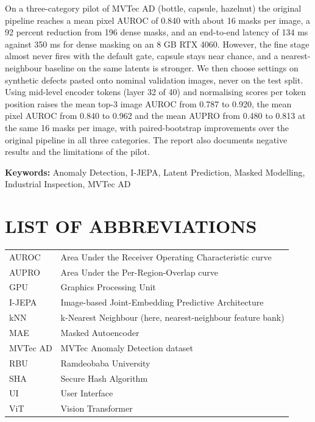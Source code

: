 \documentclass[12pt,a4paper,oneside]{report}
\begin{document}
On a three-category pilot of MVTec AD (bottle, capsule, hazelnut) the
original pipeline reaches a mean pixel AUROC of 0.840 with about 16 masks
per image, a 92 percent reduction from 196 dense masks, and an end-to-end
latency of 134 ms against 350 ms for dense masking on an 8 GB RTX 4060.
However, the fine stage almost never fires with the default gate, capsule
stays near chance, and a nearest-neighbour baseline on the same latents is
stronger. We then choose settings on synthetic defects pasted onto nominal
validation images, never on the test split. Using mid-level encoder tokens
(layer 32 of 40) and normalising scores per token position raises the mean
top-3 image AUROC from 0.787 to 0.920, the mean pixel AUROC from 0.840 to
0.962 and the mean AUPRO from 0.480 to 0.813 at the same 16 masks per
image, with paired-bootstrap improvements over the original pipeline in all
three categories. The report also documents negative results and the
limitations of the pilot.

\textbf{Keywords:} Anomaly Detection, I-JEPA, Latent Prediction, Masked
Modelling, Industrial Inspection, MVTec AD

\tableofcontents
\clearpage

\listoffigures
\clearpage

\listoftables
\clearpage

\chapter*{LIST OF ABBREVIATIONS}

\begin{tabular}{ll}
AUROC & Area Under the Receiver Operating Characteristic curve\\
AUPRO & Area Under the Per-Region-Overlap curve\\
GPU & Graphics Processing Unit\\
I-JEPA & Image-based Joint-Embedding Predictive Architecture\\
kNN & k-Nearest Neighbour (here, nearest-neighbour feature bank)\\
MAE & Masked Autoencoder\\
MVTec AD & MVTec Anomaly Detection dataset\\
RBU & Ramdeobaba University\\
SHA & Secure Hash Algorithm\\
UI & User Interface\\
ViT & Vision Transformer
\end{tabular}
\end{document}

